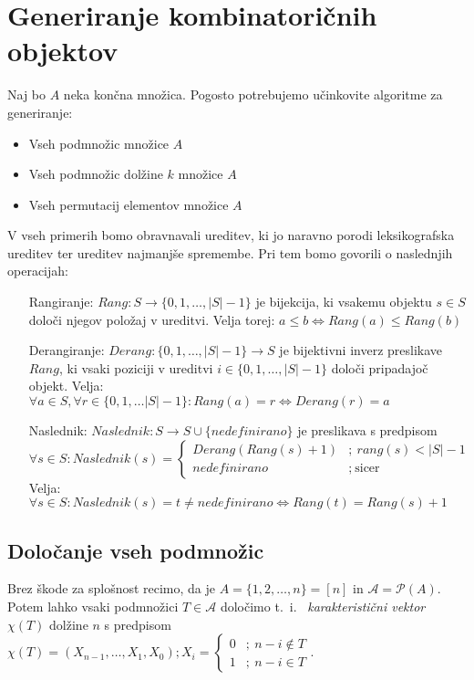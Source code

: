 \documentclass[a4paper, 10pt]{article}
\newcommand{\abs}[1]{\ensuremath{\lvert #1 \rvert}}
\newcommand{\pojem}[1]{\emph{#1}}
\newcommand{\map}[3]{\ensuremath{{#1}: {#2} \rightarrow {#3}}}
\newcommand{\Pot}[1]{\mathcal{P}({#1})}
\newcommand{\mn}[1]{\ensuremath{\left[#1\right]}}
\begin{document}
	\section{Generiranje kombinatoričnih objektov}
	Naj bo $A$ neka končna množica. Pogosto potrebujemo učinkovite algoritme za generiranje: \begin{itemize}
		\item Vseh podmnožic množice $A$
		\item Vseh podmnožic dolžine $k$ množice $A$
		\item  Vseh permutacij elementov množice $A$
	\end{itemize}
	V vseh primerih bomo obravnavali ureditev, ki jo naravno porodi leksikografska ureditev ter ureditev najmanjše spremembe. Pri tem bomo govorili o naslednjih operacijah: \begin{itemize}
		\item[Rangiranje:] $\map{Rang}{S}{\{0, 1, \ldots, \abs{S}-1\}}$ je bijekcija, ki vsakemu objektu $s\in S$ določi njegov položaj v ureditvi. Velja torej: $a\leq b \iff Rang(a)\leq Rang(b)$
		\item[Derangiranje:] $\map{Derang}{\{0, 1, \ldots, \abs{S}-1\}}{S}$ je bijektivni inverz preslikave $Rang$, ki vsaki poziciji v ureditvi $i\in \{0, 1, \ldots, \abs{S}-1\}$ določi pripadajoč objekt. Velja: $\forall a\in S,\forall r\in \{0, 1, \ldots \abs{S}-1\}: Rang(a) = r \iff Derang(r) = a$
		\item[Naslednik:] $\map{Naslednik}{S}{S\cup\{nedefinirano\}}$ je preslikava s predpisom $\forall s\in S: Naslednik(s) = \begin{cases}
		Derang(Rang(s)+1)&;~ rang(s) < \abs{S}-1 \\
		nedefinirano &;~ \text{sicer}
		\end{cases}$
		Velja: $\forall s\in S: Naslednik(s) = t\neq nedefinirano \iff Rang(t)=Rang(s) + 1$
	\end{itemize}
	
	\subsection{Določanje vseh podmnožic}
	Brez škode za splošnost recimo, da je $A = \{1, 2, \ldots, n\} = \mn{n}$ in $\mathcal{A} = \Pot{A}$. Potem lahko vsaki podmnožici $T\in \mathcal{A}$ določimo t.~i.~ \pojem{karakteristični vektor} $\chi(T)$ dolžine $n$ s predpisom $\chi(T) = (X_{n-1}, \ldots, X_{1}, X_{0}); X_i = \begin{cases}
	0 &;~ n-i \notin T \\
	1 &;~ n-i \in T
	\end{cases}$.
	
\end{document}
